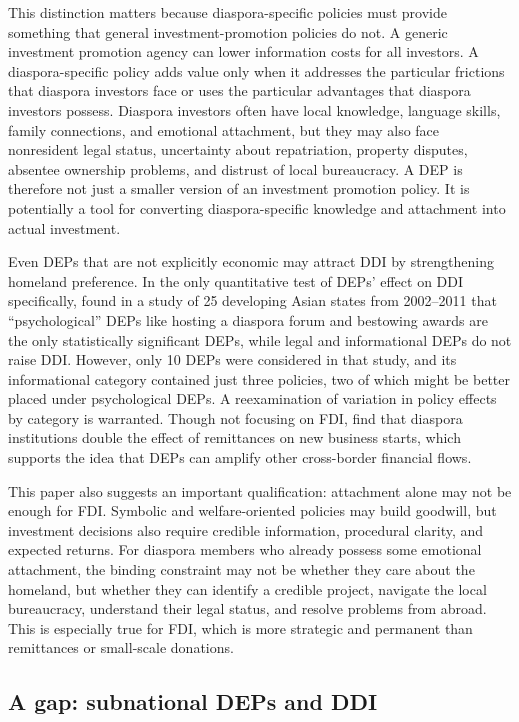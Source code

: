 \documentclass[12pt]{article}
\begin{document}
This distinction matters because diaspora-specific policies must provide something that general investment-promotion policies do not. A generic investment promotion agency can lower information costs for all investors. A diaspora-specific policy adds value only when it addresses the particular frictions that diaspora investors face or uses the particular advantages that diaspora investors possess. Diaspora investors often have local knowledge, language skills, family connections, and emotional attachment, but they may also face nonresident legal status, uncertainty about repatriation, property disputes, absentee ownership problems, and distrust of local bureaucracy. A DEP is therefore not just a smaller version of an investment promotion policy. It is potentially a tool for converting diaspora-specific knowledge and attachment into actual investment.

Even DEPs that are not explicitly economic may attract DDI by strengthening homeland preference. In the only quantitative test of DEPs' effect on DDI specifically, \citet{park_courting_2021} found in a study of 25 developing Asian states from 2002--2011 that ``psychological'' DEPs like hosting a diaspora forum and bestowing awards are the only statistically significant DEPs, while legal and informational DEPs do not raise DDI. However, only 10 DEPs were considered in that study, and its informational category contained just three policies, two of which might be better placed under psychological DEPs. A reexamination of variation in policy effects by category is warranted. Though not focusing on FDI, \citet{gamlen_human_2019} find that diaspora institutions double the effect of remittances on new business starts, which supports the idea that DEPs can amplify other cross-border financial flows.

This paper also suggests an important qualification: attachment alone may not be enough for FDI. Symbolic and welfare-oriented policies may build goodwill, but investment decisions also require credible information, procedural clarity, and expected returns. For diaspora members who already possess some emotional attachment, the binding constraint may not be whether they care about the homeland, but whether they can identify a credible project, navigate the local bureaucracy, understand their legal status, and resolve problems from abroad. This is especially true for FDI, which is more strategic and permanent than remittances or small-scale donations.

\subsection{A gap: subnational DEPs and DDI}
\end{document}
